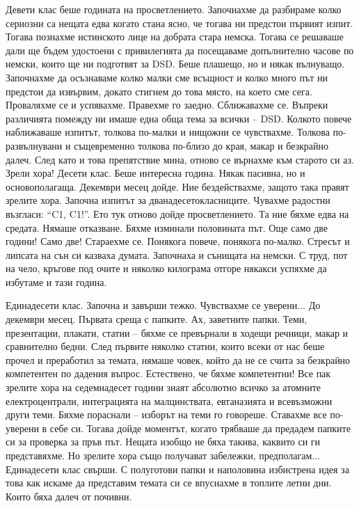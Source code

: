\begin{multicols}{3}
Девети клас беше годината на просветлението. Започнахме да разбираме колко сериозни са нещата едва когато стана ясно, че 
тогава ни предстои първият изпит. Тогава познахме истинското лице на добрата стара немска. Тогава се решаваше дали ще бъдем удостоени с привилегията да посещаваме допълнително часове по немски, които ще ни подготвят за DSD. Беше плашещо, но и някак вълнуващо. 
Започнахме да осъзнаваме колко малки сме всъщност и колко много път ни предстои да извървим, докато стигнем до това място, на което сме сега. Проваляхме се и успявахме. Правехме го заедно. Сближавахме се.  Въпреки различията помежду ни имаше една обща тема за всички – DSD. 
Колкото повече наближаваше изпитът, толкова по-малки и нищожни се чувствахме. Толкова по-развълнувани и същевременно толкова по-близо до края, макар и безкрайно далеч. След като и това препятствие мина, отново се върнахме към старото си аз. Зрели хора!
Десети клас. Беше интересна година. Някак пасивна, но и основополагаща. Декември месец дойде. Ние бездействахме, защото така правят зрелите хора. Започна изпитът за дванадесетокласниците. Чувахме радостни възгласи: “C1, C1!”. Ето тук отново 
дойде просветлението. Та ние бяхме едва на средата. Нямаше отказване. Бяхме изминали половината път. Още само две години! Само две! 
Стараехме се. Понякога повече, понякога по-малко. Стресът и липсата на сън си казваха думата. Започнаха и сънищата на немски.  С труд, пот на чело, кръгове под очите и няколко килограма отгоре някакси 
успяхме да избутаме и тази година.

Единадесети клас. Започна и завърши тежко. Чувствахме се уверени... До декември месец. Първата среща с папките. Ах, заветните папки. Теми, презентации, плакати, статии – бяхме се превърнали в ходещи речници, макар и сравнително бедни. След първите няколко статии, които всеки от нас беше прочел и преработил за темата, нямаше човек, който да не се счита за безкрайно компетентен по дадения въпрос. 
Естествено, че бяхме компетентни! Все пак зрелите хора на седемнадесет години знаят абсолютно всичко за атомните електроцентрали, интеграцията на малцинствата, евтаназията и всевъзможни други теми. Бяхме пораснали – изборът на 
теми го говореше. Ставахме все по-уверени в себе си. Тогава дойде моментът, когато трябваше да предадем папките си за проверка за пръв път. Нещата изобщо не бяха такива, каквито си ги представяхме. Но зрелите хора също получават забележки, предполагам... Единадесети клас свърши. С полуготови папки и наполовина избистрена идея за това как искаме да представим темата си се впуснахме в топлите летни дни. Които бяха далеч от почивни.


\end{multicols}
